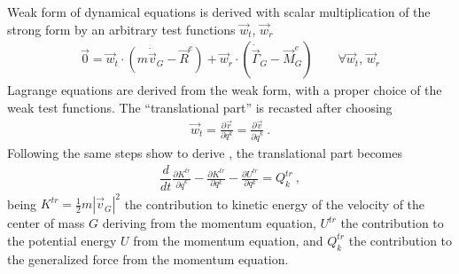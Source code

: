 \documentclass[letterpaper,10pt,english]{jupyterBook}
\begin{document}
\sphinxAtStartPar
{} Weak form of dynamical equations is derived with scalar multiplication of the strong form by an arbitrary test functions \(\vec{w}_t\), \(\vec{w}_r\)
\begin{equation}\label{equation:ch/lagrange-rigid-body:eq:lagrange:rigid:weak}
\begin{split}\vec{0} = \vec{w}_t \cdot \left( m \dot{\vec{v}}_G - \vec{R}^e\right) + \vec{w}_r \cdot \left( \dot{\vec{\Gamma}}_G - \vec{M}^e_G \right) \qquad \forall \vec{w}_t, \, \vec{w}_r\end{split}
\end{equation}
\sphinxAtStartPar
{} Lagrange equations are derived from the weak form, with a proper choice of the weak test functions. The “translational part” is recasted after choosing
\begin{equation*}
\begin{split}\vec{w}_t = \frac{\partial \vec{r}}{\partial q^k} = \frac{\partial \vec{v}}{\partial \dot{q}^k} \ .\end{split}
\end{equation*}
\sphinxAtStartPar
Following the same steps show to derive {\hyperref[\detokenize{ch/lagrange-point:classical-mechanics-lagrange-point}]{}}, the translational part becomes
\begin{equation*}
\begin{split}\dfrac{d}{dt}\frac{\partial K^{tr}}{\partial \dot{q}^k} - \frac{\partial K^{tr}}{\partial q^k} - \frac{\partial U^{tr}}{\partial q^{k}} = Q^{tr}_{k} \ ,\end{split}
\end{equation*}
\sphinxAtStartPar
being \(K^{tr} = \frac{1}{2} m |\vec{v}_G|^2\) the contribution to kinetic energy of the velocity of the center of mass \(G\) deriving from the momentum equation, \(U^{tr}\) the contribution to the potential energy \(U\) from the momentum equation, and \(Q^{tr}_{k}\) the contribution to the generalized force from the momentum equation.
\end{document}
